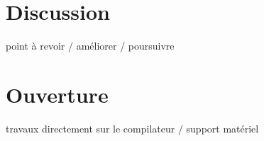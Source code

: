 \chapter*{Discussion}


point à revoir / améliorer / poursuivre


\chapter*{Ouverture}


travaux directement sur le compilateur / support matériel